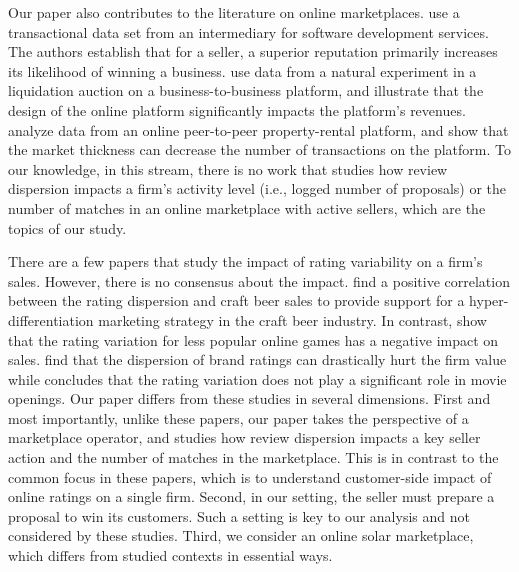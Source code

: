 \documentclass[mnsc,blindrev]{informs3}
\begin{document}
	
	Our paper also contributes to the literature on online marketplaces. \cite{moreno2014doing} use a transactional data set from an intermediary for software development services. The authors establish that for a seller,  a superior reputation primarily increases its likelihood of winning a business. \cite{bimpikis2019managing} use data from a natural experiment in a liquidation auction on a business-to-business platform, and illustrate that the design of the online platform significantly impacts the platform's revenues.  \cite{li2020higher} analyze data from an online peer-to-peer property-rental platform, and show that the market thickness can decrease the number of transactions on the platform. To our knowledge, in this stream, there is no work that studies how review dispersion impacts a firm's activity level (i.e., logged number of proposals) or the number of matches in an online marketplace with active sellers, which are the topics of our study.
	
	
	There are a few papers that study the impact of rating variability on a firm's sales. However, there is no consensus
	about the impact. \cite{clemons2006online} find a positive correlation between the rating dispersion and craft beer sales to provide support for a hyper-differentiation marketing strategy in the craft beer industry. In contrast, \cite{Zhu} show that the rating variation for less popular online games has a negative impact on sales. \cite{luo2013impact} find that the dispersion of brand ratings can drastically hurt the firm value while \cite{zhang2006tapping} concludes that the rating variation does not play a significant role in movie openings. Our paper differs from these studies in several dimensions. First and most importantly, unlike these papers, our paper takes the perspective of a marketplace operator, and studies how review dispersion impacts a key seller action and the number of matches in the marketplace. This is in contrast to the common focus in these papers, which is to understand customer-side impact of online ratings on a single firm. Second, in our setting, the seller must prepare a proposal to win its customers. Such a setting is key to our analysis and not considered by these studies. Third, we consider an online solar marketplace, which differs from studied contexts in essential ways.
	
\end{document}
